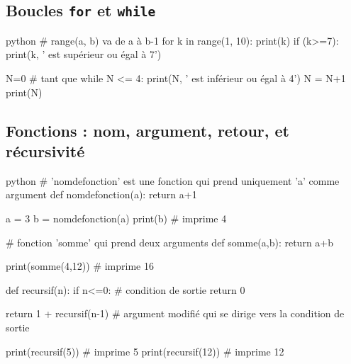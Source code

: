 \subsection*{Boucles \texttt{for} et \texttt{while}}

\begin{mintedbox}{python}
# range(a, b) va de a à b-1
for k in range(1, 10):
	print(k)
	if (k>=7):
		print(k, ' est supérieur ou égal à 7')

N=0		
# tant que 
while N <= 4:
	print(N, ' est inférieur ou égal à 4')
	N = N+1
print(N)
\end{mintedbox}

\subsection*{Fonctions : nom, argument, retour, et récursivité}

\begin{mintedbox}{python}
# 'nomdefonction' est une fonction qui prend uniquement 'a' comme argument
def nomdefonction(a):
	return a+1

a = 3
b = nomdefonction(a)
print(b) # imprime 4

# fonction 'somme' qui prend deux arguments
def somme(a,b):
	return a+b

print(somme(4,12)) # imprime 16

def recursif(n):
	if n<=0: # condition de sortie
		return 0
	
	return 1 + recursif(n-1) # argument modifié qui se dirige vers la condition de sortie

print(recursif(5)) # imprime 5
print(recursif(12)) # imprime 12
\end{mintedbox}


